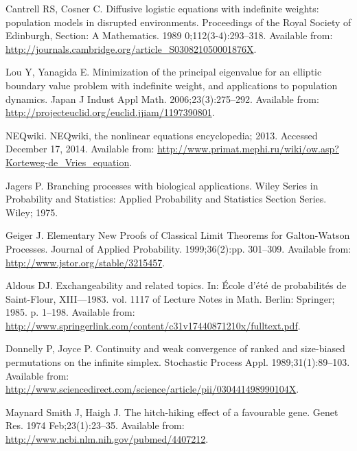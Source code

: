 \documentclass[10pt,letterpaper]{article}
\begin{document}
\begin{thebibliography}{10}
Cantrell RS, Cosner C.
\newblock Diffusive logistic equations with indefinite weights: population
  models in disrupted environments.
\newblock Proceedings of the Royal Society of Edinburgh, Section: A
  Mathematics. 1989 0;112(3-4):293--318.
\newblock Available from:
  \url{http://journals.cambridge.org/article_S030821050001876X}.

Lou Y, Yanagida E.
\newblock Minimization of the principal eigenvalue for an elliptic boundary
  value problem with indefinite weight, and applications to population
  dynamics.
\newblock Japan J Indust Appl Math. 2006;23(3):275--292.
\newblock Available from:
  \url{http://projecteuclid.org/euclid.jjiam/1197390801}.

NEQwiki. {NEQwiki}, the nonlinear equations encyclopedia; 2013.
\newblock Accessed December 17, 2014.
\newblock Available from:
  \url{http://www.primat.mephi.ru/wiki/ow.asp?Korteweg-de_Vries_equation}.

Jagers P.
\newblock Branching processes with biological applications.
\newblock Wiley Series in Probability and Statistics: Applied Probability and
  Statistics Section Series. Wiley; 1975.

Geiger J.
\newblock Elementary New Proofs of Classical Limit Theorems for
  {Galton}-{Watson} Processes.
\newblock Journal of Applied Probability. 1999;36(2):pp. 301--309.
\newblock Available from: \url{http://www.jstor.org/stable/3215457}.

Aldous DJ.
\newblock Exchangeability and related topics.
\newblock In: École d'été de probabilités de {S}aint-{F}lour,
  {XIII}---1983. vol. 1117 of Lecture Notes in Math. Berlin: Springer; 1985. p.
  1--198.
\newblock Available from:
  \url{http://www.springerlink.com/content/c31v17440871210x/fulltext.pdf}.

Donnelly P, Joyce P.
\newblock Continuity and weak convergence of ranked and size-biased
  permutations on the infinite simplex.
\newblock Stochastic Process Appl. 1989;31(1):89--103.
\newblock Available from:
  \url{http://www.sciencedirect.com/science/article/pii/030441498990104X}.

{Maynard Smith} J, Haigh J.
\newblock The hitch-hiking effect of a favourable gene.
\newblock Genet Res. 1974 Feb;23(1):23--35.
\newblock Available from: \url{http://www.ncbi.nlm.nih.gov/pubmed/4407212}.


\end{thebibliography}
\end{document}

